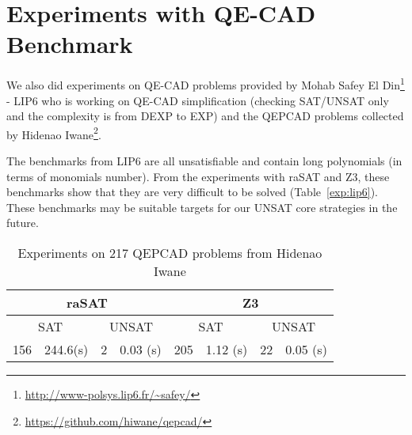 \begin{table*}[t]
\centering
{}
\medskip 
\caption{Comparison among SMT solvers} \label{tab:comparison}
\end{table*}


\section{Experiments with QE-CAD Benchmark}
We also did experiments on QE-CAD problems provided by Mohab Safey El Din\footnote{\url{http://www-polsys.lip6.fr/~safey/}} - LIP6 who is working on QE-CAD simplification (checking SAT/UNSAT only and the complexity is from DEXP to EXP) and the QEPCAD problems collected by Hidenao Iwane\footnote{\url{https://github.com/hiwane/qepcad/}}. 

The benchmarks from LIP6 are all unsatisfiable and contain long polynomials (in terms of monomials number). From the experiments with raSAT and Z3, these benchmarks show that they are very difficult to be solved (Table~\ref{exp:lip6}). These benchmarks may be suitable targets for our UNSAT core strategies in the future. 

\begin{table} 
\begin{center}
\begin{tabular}{|c|c|c|c|c|c|c|c|}
\hline
\multicolumn{4}{|c|}{raSAT} & \multicolumn{4}{c|}{Z3}\\ \hline
\multicolumn{2}{|c|}{SAT}  & \multicolumn{2}{c|}{UNSAT} & \multicolumn{2}{c|}{SAT} & \multicolumn{2}{c|}{UNSAT} \\ \hline
156 & 244.6(s) & 2 & 0.03 (s) & 205 & 1.12 (s) & 22 & 0.05 (s) \\ \hline
\end{tabular}
\end{center}
\caption{Experiments on 217 QEPCAD problems from Hidenao Iwane}
\label{exp:hiwane}
\end{table}

